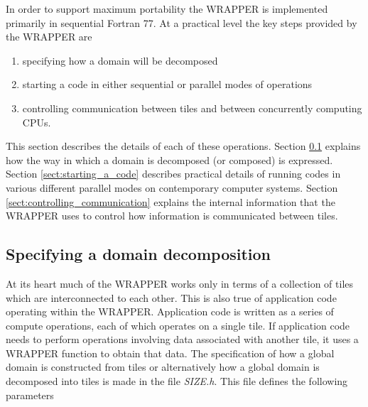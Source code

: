 In order to support maximum portability the WRAPPER is implemented
primarily in sequential Fortran 77. At a practical level the key steps
provided by the WRAPPER are
\begin{enumerate}
\item specifying how a domain will be decomposed
\item starting a code in either sequential or parallel modes of operations
\item controlling communication between tiles and between concurrently
  computing CPUs.
\end{enumerate} 
This section describes the details of each of these operations.
Section \ref{sect:specifying_a_decomposition} explains how the way in
which a domain is decomposed (or composed) is expressed. Section
\ref{sect:starting_a_code} describes practical details of running
codes in various different parallel modes on contemporary computer
systems.  Section \ref{sect:controlling_communication} explains the
internal information that the WRAPPER uses to control how information
is communicated between tiles.

\subsection{Specifying a domain decomposition}
\label{sect:specifying_a_decomposition}

At its heart much of the WRAPPER works only in terms of a collection of tiles
which are interconnected to each other. This is also true of application
code operating within the WRAPPER. Application code is written as a series
of compute operations, each of which operates on a single tile. If
application code needs to perform operations involving data
associated with another tile, it uses a WRAPPER function to obtain
that data.
The specification of how a global domain is constructed from tiles or alternatively
how a global domain is decomposed into tiles is made in the file {\em SIZE.h}.
This file defines the following parameters \\

 \\

